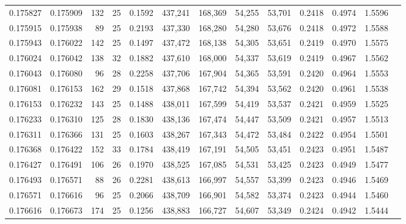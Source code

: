 \begin{tabular}{rrrrrrrrrrrrr}
0.175827 & 0.175909 & 132 &  25 &                                     0.1592 & 437,241 & 168,369 &  54,255 &  53,701 & 0.2418 & 0.4974 & 1.5596 \\
0.175915 & 0.175938 &  89 &  25 &                                     0.2193 & 437,330 & 168,280 &  54,280 &  53,676 & 0.2418 & 0.4972 & 1.5588 \\
0.175943 & 0.176022 & 142 &  25 &                                     0.1497 & 437,472 & 168,138 &  54,305 &  53,651 & 0.2419 & 0.4970 & 1.5575 \\
0.176024 & 0.176042 & 138 &  32 &                                     0.1882 & 437,610 & 168,000 &  54,337 &  53,619 & 0.2419 & 0.4967 & 1.5562 \\
0.176043 & 0.176080 &  96 &  28 &                                     0.2258 & 437,706 & 167,904 &  54,365 &  53,591 & 0.2420 & 0.4964 & 1.5553 \\
0.176081 & 0.176153 & 162 &  29 &                                     0.1518 & 437,868 & 167,742 &  54,394 &  53,562 & 0.2420 & 0.4961 & 1.5538 \\
0.176153 & 0.176232 & 143 &  25 &                                     0.1488 & 438,011 & 167,599 &  54,419 &  53,537 & 0.2421 & 0.4959 & 1.5525 \\
0.176233 & 0.176310 & 125 &  28 &                                     0.1830 & 438,136 & 167,474 &  54,447 &  53,509 & 0.2421 & 0.4957 & 1.5513 \\
0.176311 & 0.176366 & 131 &  25 &                                     0.1603 & 438,267 & 167,343 &  54,472 &  53,484 & 0.2422 & 0.4954 & 1.5501 \\
0.176368 & 0.176422 & 152 &  33 &                                     0.1784 & 438,419 & 167,191 &  54,505 &  53,451 & 0.2423 & 0.4951 & 1.5487 \\
0.176427 & 0.176491 & 106 &  26 &                                     0.1970 & 438,525 & 167,085 &  54,531 &  53,425 & 0.2423 & 0.4949 & 1.5477 \\
0.176493 & 0.176571 &  88 &  26 &                                     0.2281 & 438,613 & 166,997 &  54,557 &  53,399 & 0.2423 & 0.4946 & 1.5469 \\
0.176571 & 0.176616 &  96 &  25 &                                     0.2066 & 438,709 & 166,901 &  54,582 &  53,374 & 0.2423 & 0.4944 & 1.5460 \\
0.176616 & 0.176673 & 174 &  25 &                                     0.1256 & 438,883 & 166,727 &  54,607 &  53,349 & 0.2424 & 0.4942 & 1.5444 \\

\end{tabular}
